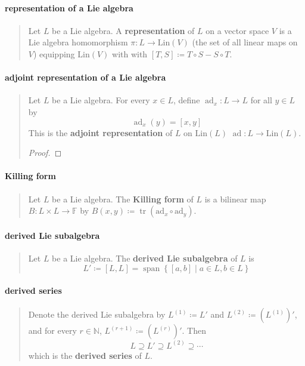 \documentclass[letterpaper, 10pt]{article}
\theoremstyle{theostyle}
\begin{document}
\paragraph{representation of a Lie algebra}
\begin{quote}
    Let \(L\) be a Lie algebra.
    A \textbf{representation} of \(L\) on a vector space \(V\) is a Lie algebra homomorphism \(\pi: L \rightarrow \mathrm{Lin}(V)\) (the set of all linear maps on \(V\)) equipping
    \(\mathrm{Lin}(V)\) with with \([T, S] \coloneqq T \circ S - S \circ T\).
\end{quote}

\paragraph{adjoint representation of a Lie algebra}
\begin{quote}
    Let \(L\) be a Lie algebra.
    For every \(x \in L\), define \(\operatorname{ad}_x : L \rightarrow L\) for all \(y \in L\) by
    \[\operatorname{ad}_x (y) = [x, y]\]
    This is the \textbf{adjoint representation} of \(L\) on \(\mathrm{Lin}(L)\) \(\operatorname{ad} : L \rightarrow \mathrm{Lin}(L)\).

    \begin{proof}
    \end{proof}
\end{quote}

\paragraph{Killing form}
\begin{quote}
    Let \(L\) be a Lie algebra.
    The \textbf{Killing form} of \(L\) is a bilinear map \(B : L \times L \rightarrow \mathbb{F}\) by \(B(x, y) \coloneqq \operatorname{tr}{(\mathrm{ad}_x \circ \mathrm{ad}_y)}\).
\end{quote}

\paragraph{derived Lie subalgebra}
\begin{quote}
    Let \(L\) be a Lie algebra.
    The \textbf{derived Lie subalgebra} of \(L\) is 
    \[L' \coloneqq [L, L] = \operatorname{span}{\left\{[a, b] \mid a \in L, b \in L\right\}}\]
\end{quote}

\paragraph{derived series}
\begin{quote}
    Denote the derived Lie subalgebra by \(L^{(1)} \coloneqq L'\) and \(L^{(2)} \coloneqq (L^{(1)})'\), and for every \(r \in \mathbb{N}\),
    \(L^{(r+1)} \coloneqq (L^{(r)})'\).
    Then
    \[L \supseteq L' \supseteq L^{(2)} \supseteq \cdots\]
    which is the \textbf{derived series} of \(L\).
\end{quote}
\end{document}
